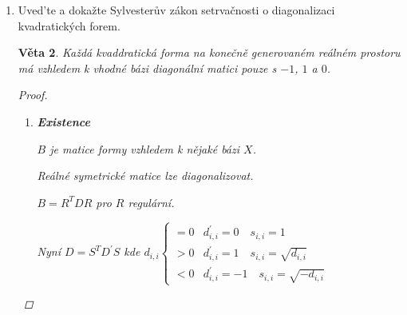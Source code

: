 \documentclass[10pt,a4paper]{article}
\theoremstyle{plain}
\newtheorem{veta}{Věta}
\begin{document}
\begin{enumerate}
\begin{veta}
\begin{proof}
\begin{itemize}
Kde $A_{n-1} = \tilde{A} - \frac{1}{\alpha} aa^T$ je symetrická.

Dle indukčního předpokladu $\exists R_{n-1}$ pro $A_{n-1}$

Zvolíme $R_n = \begin{array}{|c|c|} \hline  1 & 0^T  \\ \hline 0 & R_{n-1} \\ \hline \end{array} \cdot P_n$

Pak $ R_nA_nR_n^T = \begin{array}{|c|c|} \hline  \alpha & 0^T  \\ \hline 0 & R_{n-1}A_{n-1}R_{n-1}^T \\ \hline \end{array}  $ je diagonální.

\item $\alpha = 0$ a $a \neq 0$, pak $a_{i,1} \neq 0$ pro nějaké $i$.

Použijeme elementární matici $E$ pro přičtení $i$-tého řádku k prvnímu, vezmeme $A^\prime = EAE^T$ namísto $A$ a můžeme postupovat jako v prvním případě.

\item $\alpha = 0$ a $a = 0$, vezmeme $A_{n-1} = \tilde{A}$ a $R_n = \begin{array}{|c|c|} \hline  1 & 0^T  \\ \hline 0 & R_{n-1} \\ \hline \end{array} $

\end{itemize}
\end{proof}
\end{veta}

\item Uved'te a dokažte Sylvesterův zákon setrvačnosti o diagonalizaci kvadratických forem.
\begin{veta}
Každá kvaddratická forma na konečně generovaném reálném prostoru má vzhledem k vhodné bázi diagonální matici pouze s $-1$, $1$ a $0$.
\begin{proof}
\begin{enumerate}
\item \textbf{Existence}

$B$ je matice formy vzhledem k nějaké bázi $X$.

Reálné symetrické matice lze diagonalizovat.

$B = R^TDR$ pro $R$ regulární.

Nyní $D = S^TD^\prime S$ kde $d_{i,i} \begin{cases} 
= 0 & d^\prime_{i,i} = 0 \quad s_{i,i} = 1 \\
> 0 & d^\prime_{i,i} = 1 \quad s_{i,i} = \sqrt{d_{i,i}} \\
< 0 & d^\prime_{i,i} = -1 \quad s_{i,i} = \sqrt{-d_{i,i}} \end{cases}$


\end{enumerate}
\end{proof}
\end{veta}
\end{enumerate}
\end{document}
